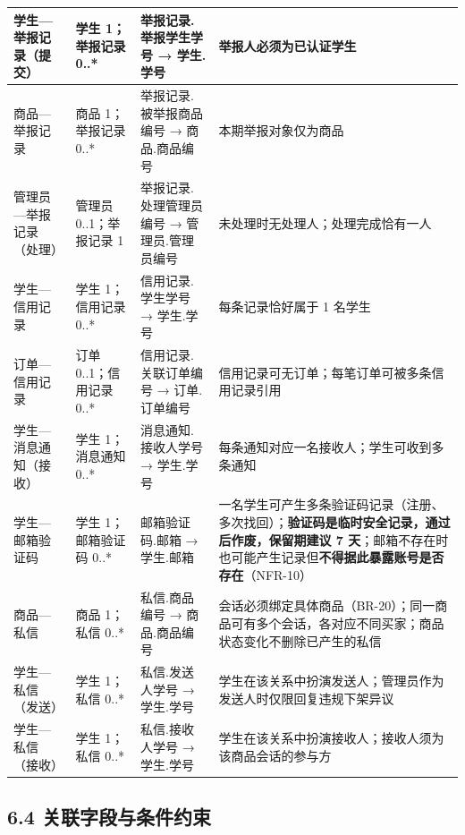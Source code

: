 \documentclass[12pt,a4paper]{ctexart}
\begin{document}
{\begin{longtable}{|p{2.09cm}|p{2.15cm}|p{3.28cm}|p{8.48cm}|}
\hline
学生—举报记录（提交） & 学生 1；举报记录 0..* & 举报记录.举报学生学号 → 学生.学号 & 举报人必须为已认证学生 \\
\hline
商品—举报记录 & 商品 1；举报记录 0..* & 举报记录.被举报商品编号 → 商品.商品编号 & 本期举报对象仅为商品 \\
\hline
管理员—举报记录（处理） & 管理员 0..1；举报记录 1 & 举报记录.处理管理员编号 → 管理员.管理员编号 & 未处理时无处理人；处理完成恰有一人 \\
\hline
学生—信用记录 & 学生 1；信用记录 0..* & 信用记录.学生学号 → 学生.学号 & 每条记录恰好属于 1 名学生 \\
\hline
订单—信用记录 & 订单 0..1；信用记录 0..* & 信用记录.关联订单编号 → 订单.订单编号 & 信用记录可无订单；每笔订单可被多条信用记录引用 \\
\hline
学生—消息通知（接收） & 学生 1；消息通知 0..* & 消息通知.接收人学号 → 学生.学号 & 每条通知对应一名接收人；学生可收到多条通知 \\
\hline
学生—邮箱验证码 & 学生 1；邮箱验证码 0..* & 邮箱验证码.邮箱 → 学生.邮箱 & 一名学生可产生多条验证码记录（注册、多次找回）；\textbf{验证码是临时安全记录，通过后作废，保留期建议 7 天}；邮箱不存在时也可能产生记录但\textbf{不得据此暴露账号是否存在}（NFR-10） \\
\hline
商品—私信 & 商品 1；私信 0..* & 私信.商品编号 → 商品.商品编号 & 会话必须绑定具体商品（BR-20）；同一商品可有多个会话，各对应不同买家；商品状态变化不删除已产生的私信 \\
\hline
学生—私信（发送） & 学生 1；私信 0..* & 私信.发送人学号 → 学生.学号 & 学生在该关系中扮演发送人；管理员作为发送人时仅限回复违规下架异议 \\
\hline
学生—私信（接收） & 学生 1；私信 0..* & 私信.接收人学号 → 学生.学号 & 学生在该关系中扮演接收人；接收人须为该商品会话的参与方 \\
\hline
\end{longtable}
}


\subsection*{6.4 关联字段与条件约束}
\end{document}
